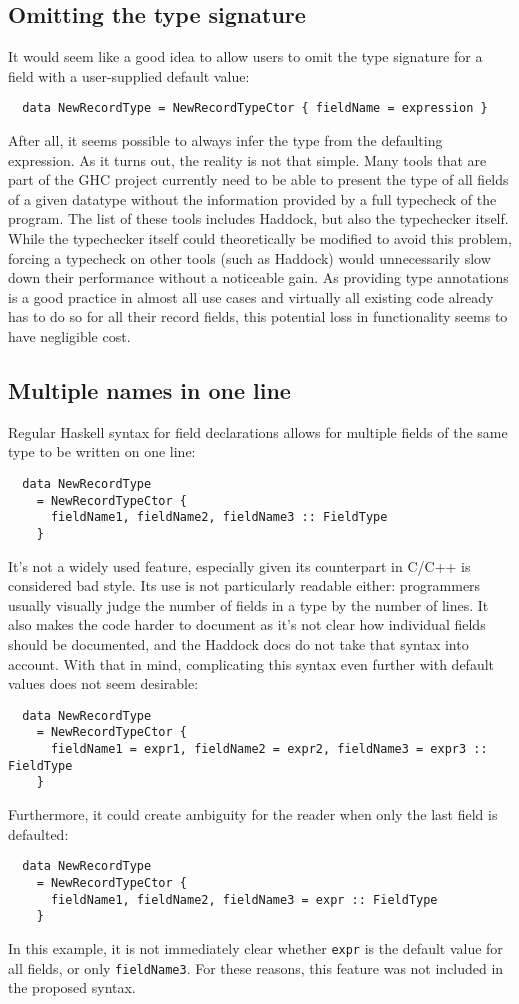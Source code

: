 \documentclass[en]{pracamgr}
\newcommand{\code}[1]{\lstinline[breaklines=true]{#1}}
\begin{document}
\subsection{Omitting the type signature}
It would seem like a good idea to allow users to omit the type signature for a field with a user-supplied default value:
\begin{lstlisting}
  data NewRecordType = NewRecordTypeCtor { fieldName = expression }
\end{lstlisting}
After all, it seems possible to always infer the type from the defaulting expression.
As it turns out, the reality is not that simple.
Many tools that are part of the GHC project currently need to be able to present the type of all fields of a given datatype without the information provided by a full typecheck of the program.
The list of these tools includes Haddock, but also the typechecker itself.
While the typechecker itself could theoretically be modified to avoid this problem, 
forcing a typecheck on other tools (such as Haddock) would unnecessarily slow down their performance without a noticeable gain.
As providing type annotations is a good practice in almost all use cases and virtually all existing code already has to do so 
for all their record fields, this potential loss in functionality seems to have negligible cost.

\subsection{Multiple names in one line}
Regular Haskell syntax for field declarations allows for multiple fields of the same type to be written on one line:
\begin{lstlisting}
  data NewRecordType 
    = NewRecordTypeCtor { 
      fieldName1, fieldName2, fieldName3 :: FieldType 
    }
\end{lstlisting}
It's not a widely used feature, especially given its counterpart in C/C++ is considered bad style.
Its use is not particularly readable either: programmers usually visually judge the number of fields in a type by the number of lines.
It also makes the code harder to document as it's not clear how individual fields should be documented, and the Haddock docs \cite{HaddockRecordFields}
do not take that syntax into account.
With that in mind, complicating this syntax even further with default values does not seem desirable:
\begin{lstlisting}
  data NewRecordType 
    = NewRecordTypeCtor { 
      fieldName1 = expr1, fieldName2 = expr2, fieldName3 = expr3 :: FieldType 
    }
\end{lstlisting}
Furthermore, it could create ambiguity for the reader when only the last field is defaulted:
\begin{lstlisting}
  data NewRecordType 
    = NewRecordTypeCtor { 
      fieldName1, fieldName2, fieldName3 = expr :: FieldType 
    }
\end{lstlisting}
In this example, it is not immediately clear whether \code{expr} is the default value for all fields, or only \code{fieldName3}.
For these reasons, this feature was not included in the proposed syntax.
\end{document}

